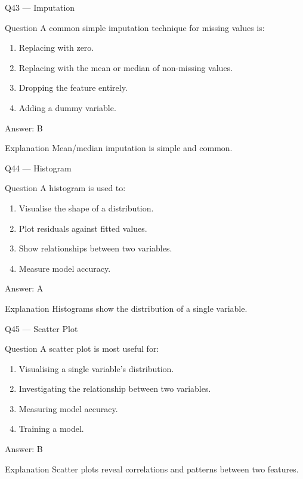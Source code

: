\documentclass[aspectratio=169,8pt]{beamer}
\begin{document}
	\begin{frame}{Q43 --- Imputation}
		\begin{block}{Question}
			A common simple imputation technique for missing values is:
		\end{block}
		\begin{enumerate}
			\item Replacing with zero.
			\item Replacing with the mean or median of non-missing values.
			\item Dropping the feature entirely.
			\item Adding a dummy variable.
		\end{enumerate}
		\begin{exampleblock}{Answer: B}\end{exampleblock}
		\begin{block}{Explanation}
			Mean/median imputation is simple and common.
		\end{block}
	\end{frame}
	
	\begin{frame}{Q44 --- Histogram}
		\begin{block}{Question}
			A histogram is used to:
		\end{block}
		\begin{enumerate}
			\item Visualise the shape of a distribution.
			\item Plot residuals against fitted values.
			\item Show relationships between two variables.
			\item Measure model accuracy.
		\end{enumerate}
		\begin{exampleblock}{Answer: A}\end{exampleblock}
		\begin{block}{Explanation}
			Histograms show the distribution of a single variable.
		\end{block}
	\end{frame}
	
	\begin{frame}{Q45 --- Scatter Plot}
		\begin{block}{Question}
			A scatter plot is most useful for:
		\end{block}
		\begin{enumerate}
			\item Visualising a single variable's distribution.
			\item Investigating the relationship between two variables.
			\item Measuring model accuracy.
			\item Training a model.
		\end{enumerate}
		\begin{exampleblock}{Answer: B}\end{exampleblock}
		\begin{block}{Explanation}
			Scatter plots reveal correlations and patterns between two features.
		\end{block}
	\end{frame}
	
\end{document}

